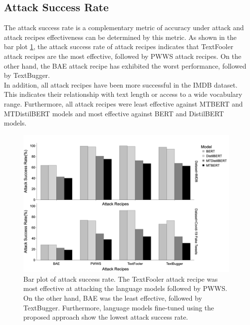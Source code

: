 \documentclass[%
	BCOR=8mm, %
	DIV=12,
	toc=bibliography, %
	toc=listof, %
	oneside, %
	egregdoesnotlikesansseriftitles, %
	]{scrbook}
\begin{document}
\subsection{Attack Success Rate}
The attack success rate is a complementary metric of accuracy under attack and attack recipes effectiveness can be determined by this metric.
As shown in the bar plot \ref{fig:attacksuccessrate}, the attack success rate of attack recipes indicates that TextFooler attack recipes are the most effective, followed by PWWS attack recipes. On the other hand, the BAE attack recipe has exhibited the worst performance, followed by TextBugger. \\
In addition, all attack recipes have been more successful in the IMDB dataset. This indicates their relationship with text length or access to a wide vocabulary range. Furthermore, all attack recipes were least effective against MTBERT and MTDistilBERT models and most effective against BERT and DistilBERT models.
\begin{figure}[H]
    \centering
    \includegraphics[width=.9\linewidth]{img/attack_success_rate.png}
    \caption[Bar plot of attack success rate]{Bar plot of attack success rate. The TextFooler attack recipe was most effective at attacking the language models followed by PWWS. On the other hand, BAE was the least effective, followed by TextBugger. Furthermore, language models fine-tuned using the proposed approach show the lowest attack success rate. }
    \label{fig:attacksuccessrate}
\end{figure}
\end{document}
